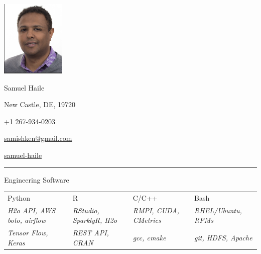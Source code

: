 \documentclass[a4paper,10pt]{article}
\newlength{\cvcolumngapwidth}
\newlength{\cvleftcolumnwidth}
\newlength{\cvrightcolumnwidth}
\newcommand{\cvnamestyle}[1]{{\Large\cvnamefont\textcolor{cvnamecolor}{#1}}}
\newcommand{\cvsectionstyle}[1]{{\normalsize\cvsectionfont\textcolor{cvsectioncolor}{#1}}}
\newcommand{\cvheadingstyle}[1]{{\normalsize\cvheadingfont\textcolor{cvheadingcolor}{#1}}}
\newlength{\cvafteritemskipamount}
\newlength{\cvaftersectionskipamount}
\newlength{\cvbetweensectionandheadingextraskipamount}
\newlength{\cvafternameskipamount}
\newlength{\cvafterpersonalinfolineskipamount}
\newlength{\cvparskip}
\newcommand{\cvpersonalinfo}[2]{
    \begin{minipage}[t]{\cvleftcolumnwidth}
        \vspace{0mm} %
        \raggedleft #1
    \end{minipage}%
    \hspace{\cvcolumngapwidth}%
    \begin{minipage}[t]{\cvrightcolumnwidth}
        \vspace{0mm} %
        #2
    \end{minipage}

    \vspace{\cvafteritemskipamount}
}
\newcommand{\cvname}[1]{
    \cvnamestyle{#1}

    \vspace{\cvafternameskipamount}
}
\newcommand{\cvpersonalinfolinewithicon}[3]{
    \raisebox{.5\fontcharht\font`E-.5\height}{\texttt{[image: \#2]}}
    #3

    \vspace{\cvafterpersonalinfolineskipamount}
}
\newcommand{\cvsection}[1]{
    \begin{minipage}[t]{\cvleftcolumnwidth}
        \raggedleft\cvsectionstyle{#1}
    \end{minipage}%
    \hspace{\cvcolumngapwidth}%
    \begin{minipage}[t]{\cvrightcolumnwidth}
        \textcolor{cvrulecolor}{\rule{\cvrightcolumnwidth}{0.3mm}}
    \end{minipage}

    \vspace{\cvaftersectionskipamount}
}
\newcommand{\cvitem}[2]{
    \begin{minipage}[t]{\cvleftcolumnwidth}
        \raggedleft #1
    \end{minipage}%
    \hspace{\cvcolumngapwidth}%
    \begin{minipage}[t]{\cvrightcolumnwidth}
        \setlength{\parskip}{\cvparskip} #2
    \end{minipage}

    \vspace{\cvafteritemskipamount}
}
\begin{document}

\cvpersonalinfo{
    \includegraphics[height=36.5mm]{samprofile.png}
    }{
    \cvname{Samuel Haile}

    \cvpersonalinfolinewithicon{height=4mm}{072-location.pdf}{
        New Castle, DE, 19720
    }

    \cvpersonalinfolinewithicon{height=4mm}{067-phone.pdf}{
        +1 267-934-0203
    }

    \cvpersonalinfolinewithicon{height=4mm}{070-envelop.pdf}{
        \href{mailto:samishken@gmail.com}{samishken@gmail.com}
    }

    \cvpersonalinfolinewithicon{height=4mm}{458-linkedin.pdf}{
        \href{https://www.linkedin.com/in/samuel-haile-ga/}{samuel-haile}
    }




}


\cvsection{\textbf{SKILLS}}

\vspace{\cvbetweensectionandheadingextraskipamount}


\cvitem{
    \cvheadingstyle{Engineering Software}

}{
        \setlength\tabcolsep{5pt}
        \begin{tabular}{|l|l|l|l|}

        Python   & R   & C/C++  & Bash \\
        \footnotesize{\emph{H2o API, AWS boto, airﬂow }} &
        \footnotesize{\emph{RStudio, SparklyR, H2o}} &
        \footnotesize{\emph{RMPI, CUDA, CMetrics }} &
        \footnotesize{\emph{RHEL/Ubuntu, RPMs}}\\

        \footnotesize{\emph{Tensor Flow, Keras}} &
         \footnotesize{\emph{REST API, CRAN}} &
         \footnotesize{\emph{gcc, cmake}} &
         \footnotesize{\emph{git, HDFS, Apache }}\\


        \end{tabular}
}
\end{document}
